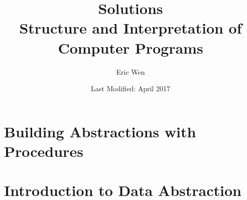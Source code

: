 \documentclass[a4paper]{report}
\begin{document}
\title{Solutions \\
\large Structure and Interpretation of Computer Programs}
\author{Eric Wen}
\date{Last Modified: April 2017}
\maketitle

\begin{multicols}{2}
  \tableofcontents
\end{multicols}

%
%

\chapter{Building Abstractions with Procedures}



%
%

\chapter{Introduction to Data Abstraction}


\end{document}
